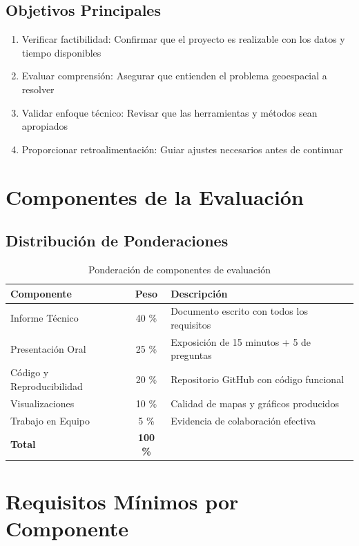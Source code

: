 \documentclass[11pt,a4paper]{article}
\begin{document}
\subsection{Objetivos Principales}
\begin{enumerate}[leftmargin=1.2cm]
  \item Verificar factibilidad: Confirmar que el proyecto es realizable con los datos y tiempo disponibles
  \item Evaluar comprensión: Asegurar que entienden el problema geoespacial a resolver
  \item Validar enfoque técnico: Revisar que las herramientas y métodos sean apropiados
  \item Proporcionar retroalimentación: Guiar ajustes necesarios antes de continuar
\end{enumerate}

\newpage

\section{Componentes de la Evaluación}

\subsection{Distribución de Ponderaciones}
\begin{table}[h!]
\centering
\begin{tabularx}{\linewidth}{@{}l c X@{}}
\toprule
\textbf{Componente} & \textbf{Peso} & \textbf{Descripción}\\
\midrule
Informe Técnico & 40 \% & Documento escrito con todos los requisitos\\
Presentación Oral & 25 \% & Exposición de 15 minutos + 5 de preguntas\\
Código y Reproducibilidad & 20 \% & Repositorio GitHub con código funcional\\
Visualizaciones & 10 \% & Calidad de mapas y gráficos producidos\\
Trabajo en Equipo & 5 \% & Evidencia de colaboración efectiva\\
\midrule
\textbf{Total} & \textbf{100 \%} & \\
\bottomrule
\end{tabularx}
\caption{Ponderación de componentes de evaluación}
\end{table}

\section{Requisitos Mínimos por Componente}
\end{document}

